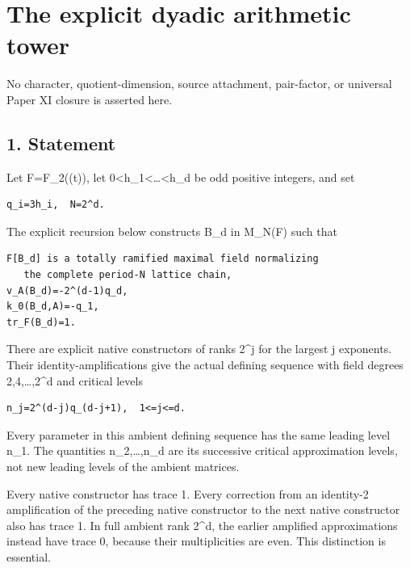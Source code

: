 \clearpage
\section{The explicit dyadic arithmetic tower}\label{app:dyadic_tower}

No character, quotient-dimension,
source attachment, pair-factor, or universal Paper XI closure is
asserted here.

\hypertarget{dyadic_tower-statement}{%
\subsection{1. Statement}\label{dyadic_tower-statement}}

Let F=F\_2((t)), let 0\textless h\_1\textless\ldots\textless h\_d be odd
positive integers, and set

\begin{Verbatim}[fontsize=\small,breaklines=true,breakanywhere=true]
q_i=3h_i,  N=2^d.
\end{Verbatim}

The explicit recursion below constructs B\_d in M\_N(F) such that

\begin{Verbatim}[fontsize=\small,breaklines=true,breakanywhere=true]
F[B_d] is a totally ramified maximal field normalizing
   the complete period-N lattice chain,
v_A(B_d)=-2^(d-1)q_d,
k_0(B_d,A)=-q_1,
tr_F(B_d)=1.
\end{Verbatim}

There are explicit native constructors of ranks 2\^{}j for the largest j
exponents. Their identity-amplifications give the actual defining
sequence with field degrees 2,4,\ldots,2\^{}d and critical levels

\begin{Verbatim}[fontsize=\small,breaklines=true,breakanywhere=true]
n_j=2^(d-j)q_(d-j+1),  1<=j<=d.
\end{Verbatim}

Every parameter in this ambient defining sequence has the same leading
level n\_1. The quantities n\_2,\ldots,n\_d are its successive critical
approximation levels, not new leading levels of the ambient matrices.

Every native constructor has trace 1. Every correction from an
identity-2 amplification of the preceding native constructor to the next
native constructor also has trace 1. In full ambient rank 2\^{}d, the
earlier amplified approximations instead have trace 0, because their
multiplicities are even. This distinction is essential.

